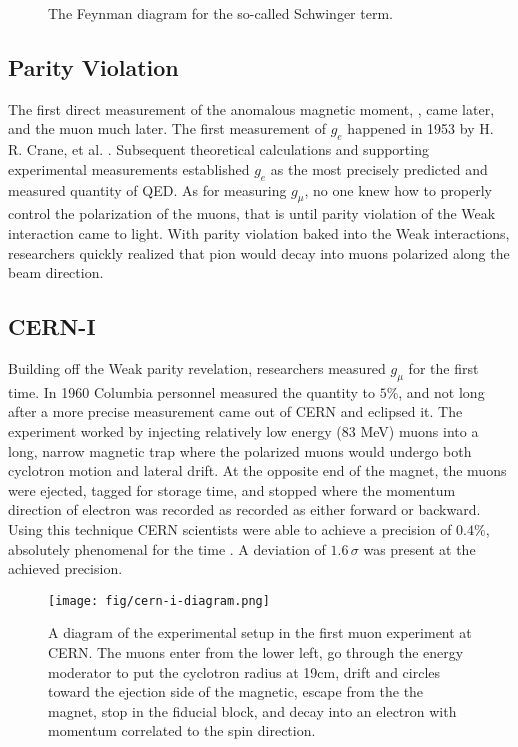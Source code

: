 \begin{figure}
\centering
{}
\label{fig:schwinger-diagram}
\caption{The Feynman diagram for the so-called Schwinger term.}
\end{figure}

\subsection{Parity Violation}
The first direct measurement of the anomalous magnetic moment, \gmtwo, came later, and the muon \gmtwo much later.  The first measurement of $g_e$ happened in 1953 by H. R. Crane, et al. .  Subsequent theoretical calculations and supporting experimental measurements established $g_e$ as the most precisely predicted and measured quantity of QED.  As for measuring $g_\mu$, no one knew how to properly control the polarization of the muons, that is until parity violation of the Weak interaction came to light.  With parity violation baked into the Weak interactions, researchers quickly realized that pion would decay into muons polarized along the beam direction.  

\subsection{CERN-I}
Building off the Weak parity revelation, researchers measured $g_\mu$ for the first time.  In 1960 Columbia personnel measured the quantity to $5\%$, and not long after a more precise measurement came out of CERN and eclipsed it.  The experiment worked by injecting relatively low energy (83 MeV) muons into a long, narrow magnetic trap where the polarized muons would undergo both cyclotron motion and lateral drift. At the opposite end of the magnet, the muons were ejected, tagged for storage time, and stopped where the momentum direction of electron was recorded as recorded as either forward or backward.  Using this technique CERN scientists were able to achieve a precision of $0.4\%$, absolutely phenomenal for the time \cite{cern-i}.  A deviation of $1.6\,\sigma$ was present at the achieved precision.

\begin{figure}
\centering
\texttt{[image: fig/cern-i-diagram.png]}
\label{fig:cern-i-diagram}
\caption{A diagram of the experimental setup in the first muon \gmtwo experiment at CERN. The muons enter from the lower left, go through the energy moderator to put the cyclotron radius at 19cm, drift and circles toward the ejection side of the magnetic, escape from the the magnet, stop in the fiducial block, and decay into an electron with momentum correlated to the spin direction.}
\end{figure}

